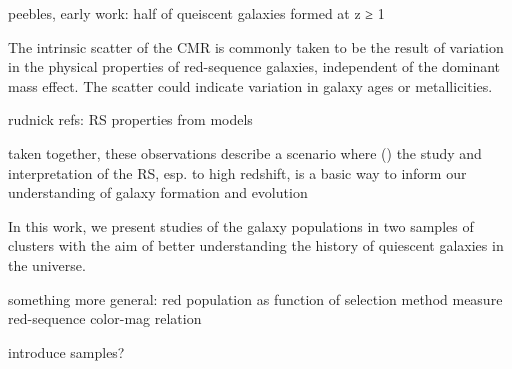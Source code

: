 peebles, early work: half of queiscent galaxies formed at z ≥ 1

The intrinsic scatter of the CMR is commonly taken to be the result of variation in the physical properties of red-sequence galaxies, independent of the dominant mass effect.
The scatter could indicate variation in galaxy ages or metallicities.

rudnick refs: RS properties from models

taken together, these observations describe a scenario where ()
the study and interpretation of the RS, esp. to high redshift, is a basic way to inform our understanding of galaxy formation and evolution




In this work, we present studies of the galaxy populations in two samples of clusters with the aim of better understanding the history of quiescent galaxies in the universe.

something more general: red population as function of selection method
measure red-sequence color-mag relation

introduce samples?

